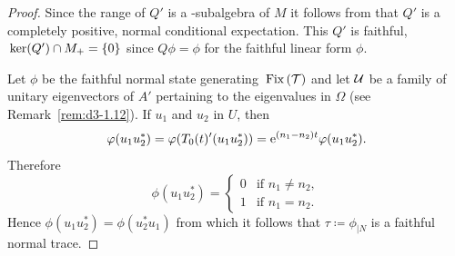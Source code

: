 \begin{proof}
Since the range of\/ $Q'$ is a \WA-subalgebra of\/ $M$ it follows from \textcite[Theorem III.3.4]{takesaki:1979} that $Q'$ is a completely positive, normal conditional expectation.
This $Q'$ is faithful, \ie $\mathop{}\mathrm{ker}(Q') \cap M_{+} = \{0\}$ since $Q\phi = \phi$ for the faithful linear form $\phi$.

Let $\phi$ be the faithful normal state generating $\mathop{}\mathrm{Fix}\left(\mathcal{T}\right)$ and let $\mathcal{U}$ be a family of unitary eigenvectors of\/ $A'$ pertaining to the eigenvalues in $\Omega$ (see Remark~\ref{rem:d3-1.12}).
If\/ $u_{1}$ and $u_{2}$ in $U$, then
\[
\phi(u_{1}u_{2}^{*}) = \phi(T_{0}(t)'(u_{1}u_{2}^{*})) = \eu^{(n_{1}-n_{2})t}\phi(u_{1}u_{2}^{*}).
\]
Therefore
\[
\phi(u_{1}u_{2}^{*}) = 
    \begin{cases} 
        0 & \text{if } n_{1} \neq n_{2}, \\ 
        1 & \text{if } n_{1} = n_{2}. 
    \end{cases}
\]
Hence $\phi(u_{1}u_{2}^{*}) = \phi(u_{2}^{*}u_{1})$ from which it follows that $\tau \coloneqq \phi_{\vert N}$ is a faithful normal trace.
\end{proof}
